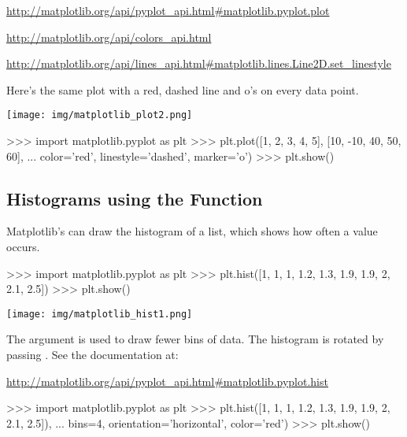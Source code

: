 \documentclass[11pt]{cselabheader}
\begin{document}
\begin{center}
\url{http://matplotlib.org/api/pyplot_api.html#matplotlib.pyplot.plot}

\url{http://matplotlib.org/api/colors_api.html}

\url{http://matplotlib.org/api/lines_api.html#matplotlib.lines.Line2D.set_linestyle}
\end{center}

Here's the same plot with a red, dashed line and o's on every data point.

\begin{center}
\texttt{[image: img/matplotlib\_plot2.png]}
\end{center}

\begin{pyconcode}
>>> import matplotlib.pyplot as plt
>>> plt.plot([1, 2, 3, 4, 5], [10, -10, 40, 50, 60],
...          color='red', linestyle='dashed', marker='o')
>>> plt.show()
\end{pyconcode}

\subsection{Histograms using the 
Function}

Matplotlib's  can draw the histogram of a
list, which shows how often a value occurs.

\begin{pyconcode}
>>> import matplotlib.pyplot as plt
>>> plt.hist([1, 1, 1, 1.2, 1.3, 1.9, 1.9, 2, 2.1, 2.5])
>>> plt.show()
\end{pyconcode}

\begin{center}
\texttt{[image: img/matplotlib\_hist1.png]}
\end{center}

The  argument is used to draw fewer bins of
data. The histogram is rotated by passing
. See the documentation at:

\begin{center}
\url{http://matplotlib.org/api/pyplot_api.html#matplotlib.pyplot.hist}
\end{center}

\begin{pyconcode}
>>> import matplotlib.pyplot as plt
>>> plt.hist([1, 1, 1, 1.2, 1.3, 1.9, 1.9, 2, 2.1, 2.5]),
...          bins=4, orientation='horizontal', color='red')
>>> plt.show()
\end{pyconcode}
\end{document}
